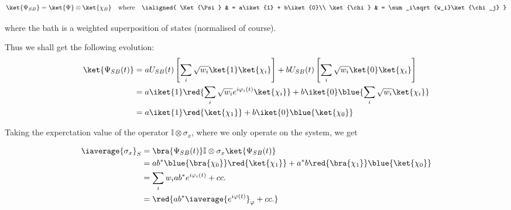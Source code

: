    \begin{equation}\label{key}
   	\ket{\Psi_{SB}} = \ket{\Psi} \otimes \ket{\chi_B} \quad\text{where}\quad 
   	\ialigned{
   		\Ket{\Psi} & = a\iket{1} + b\iket{0}\\
   		\ket{\chi} & = \sum_i\sqrt{w_i}\ket{\chi_j}
   	} 
   \end{equation}
  
  \noindent where the bath is a weighted superposition of  states (normalised of course).
  

  \noindent Thus we shall get the following evolution:
  \begin{equation}\label{key}
  	\begin{aligned}
  	\ket{\Psi_{SB}(t)} & = aU_{SB}(t)\left[\sum_i\sqrt{w_i}\ket{1}\ket{\chi_i}\right] + bU_{SB}(t)\left[\sum_i\sqrt{w_i}\ket{0}\ket{\chi_i}\right]\\
  	& = a\iket{1}\red{\sum_i\sqrt{w_i}e^{i\varphi_i(t)}\ket{\chi_i}} + b\iket{0}\blue{\sum_i\sqrt{w_i}\ket{\chi_i}}\\
  	& = a\iket{1}\red{\ket{\chi_1}} + b\iket{0}\blue{\ket{\chi_0}}
  	\end{aligned}
  \end{equation}
  \vspace{1cm}
  
  \noindent Taking the experctation value of the operator $ \mathbb{I} \otimes \sigma_x $, where we only operate on the system, we get
  
  \begin{equation}\label{key}
  	\begin{aligned}
	  	\iaverage{\sigma_x}_S & = \bra{\Psi_{SB}(t)}\mathbb{I} \otimes \sigma_x\ket{\Psi_{SB}(t)} \\
	  	& = ab^{*}\blue{\bra{\chi_0}}\red{\ket{\chi_1}} + a^{*}b\red{\bra{\chi_1}}\blue{\ket{\chi_0}}\\
	  	& = \sum_iw_iab^{*}e^{i\varphi_i(t)} + cc.\\ 
	  	& = \red{ab^{*}\iaverage{e^{i\varphi(t)}}_\varphi + cc.}
  	\end{aligned}
  \end{equation}
  
